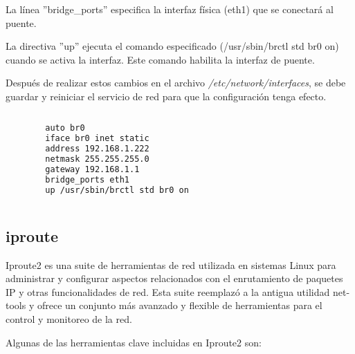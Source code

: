 		La línea ''bridge\_ports'' especifica la interfaz física (eth1) que se conectará al puente.\par
		
		La directiva ''up'' ejecuta el comando especificado (/usr/sbin/brctl std br0 on) cuando se activa la interfaz. Este comando habilita la interfaz de puente.\par
		
		Después de realizar estos cambios en el archivo \textit{/etc/network/interfaces}, se debe guardar y reiniciar el servicio de red para que la configuración tenga efecto.\par
		
		\begin{lstlisting}[language=Bash, caption=interfaz]
		
		auto br0
		iface br0 inet static
		address 192.168.1.222
		netmask 255.255.255.0
		gateway 192.168.1.1
		bridge_ports eth1
		up /usr/sbin/brctl std br0 on
		
		\end{lstlisting}

		\subsection{iproute}
		
		Iproute2 es una suite de herramientas de red utilizada en sistemas Linux para administrar y configurar aspectos relacionados con el enrutamiento de paquetes IP y otras funcionalidades de red. Esta suite reemplazó a la antigua utilidad net-tools y ofrece un conjunto más avanzado y flexible de herramientas para el control y monitoreo de la red.\par
		
		Algunas de las herramientas clave incluidas en Iproute2 son:
		
